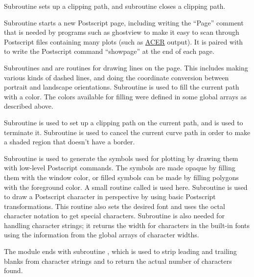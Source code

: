 Subroutine  sets up a clipping path,
and subroutine  closes a clipping path.

Subroutine  starts a new
Postscript page, including writing the ``Page'' comment that is
needed by programs such as ghostview to make it easy to scan
through Postscript files containing many plots (such as
\hyperlink{sACERhy}{ACER} output).  It is paired with
 to write the
Postscript command ``showpage'' at the end of each page.

Subroutines 
and  are
routines for drawing lines on the page.  This includes making various
kinds of dashed lines, and doing the coordinate conversion between
portrait and landscape orientations.  Subroutine
 is
used to fill the current path with a color.  The colors available
for filling were defined in some global arrays as described above.

Subroutine 
is used to set up a clipping path on the current path, and
 is used to terminate it.
Subroutine 
is used to cancel the current curve path in
order to make a shaded region that doesn't have a border.

Subroutine 
is used to generate the symbols used for
plotting by drawing them with low-level Postscript commands.  The
symbols are made opaque by filling them with the window color, or
filled symbols can be made by filling polygons with the foreground
color.  A small routine called 
is used here.  Subroutine 
is used to draw a Postscript character in perspective by using
basic Postscript transformations.  This routine
also sets the desired font and uses the octal character notation
to get special characters.  Subroutine
 is also needed
for handling character strings; it returns the width for characters
in the built-in fonts using the information from the global arrays
of character widths.

The module ends with subroutine ,
which is used to strip leading and trailing blanks from character strings
and to return the actual number of characters found.

